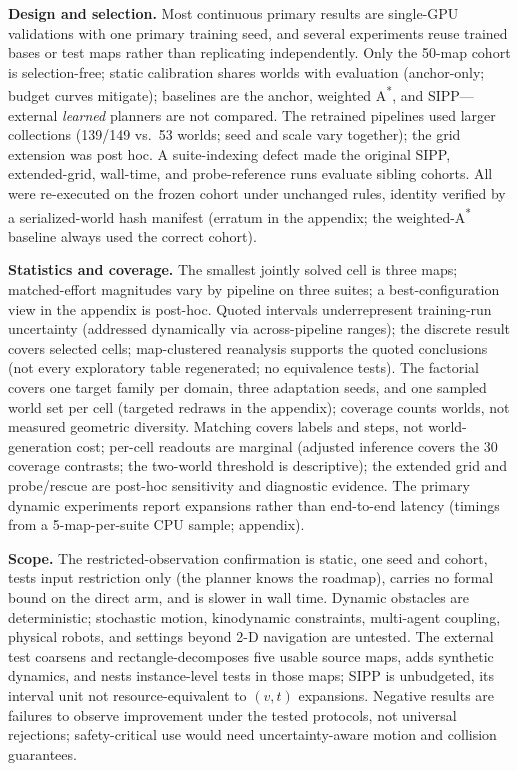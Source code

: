 \documentclass[letterpaper]{article} %
\begin{document}
\textbf{Design and selection.} Most continuous primary results are single-GPU validations with one primary training seed, and several experiments reuse trained bases or test maps rather than replicating independently. Only the 50-map cohort is selection-free; static calibration shares worlds with evaluation (anchor-only; budget curves mitigate); baselines are the anchor, weighted A\textsuperscript{*}, and SIPP---external \emph{learned} planners are not compared. The retrained pipelines used larger collections (139/149 vs.\ 53 worlds; seed and scale vary together); the grid extension was post hoc. A suite-indexing defect made the original SIPP, extended-grid, wall-time, and probe-reference runs evaluate sibling cohorts. All were re-executed on the frozen cohort under unchanged rules, identity verified by a serialized-world hash manifest (erratum in the appendix; the weighted-A\textsuperscript{*} baseline always used the correct cohort).

\textbf{Statistics and coverage.} The smallest jointly solved cell is three maps; matched-effort magnitudes vary by pipeline on three suites; a best-configuration view in the appendix is post-hoc. Quoted intervals underrepresent training-run uncertainty (addressed dynamically via across-pipeline ranges); the discrete result covers selected cells; map-clustered reanalysis supports the quoted conclusions (not every exploratory table regenerated; no equivalence tests). The factorial covers one target family per domain, three adaptation seeds, and one sampled world set per cell (targeted redraws in the appendix); coverage counts worlds, not measured geometric diversity. Matching covers labels and steps, not world-generation cost; per-cell readouts are marginal (adjusted inference covers the 30 coverage contrasts; the two-world threshold is descriptive); the extended grid and probe/rescue are post-hoc sensitivity and diagnostic evidence. The primary dynamic experiments report expansions rather than end-to-end latency (timings from a 5-map-per-suite CPU sample; appendix).

\textbf{Scope.} The restricted-observation confirmation is static, one seed and cohort, tests input restriction only (the planner knows the roadmap), carries no formal bound on the direct arm, and is slower in wall time. Dynamic obstacles are deterministic; stochastic motion, kinodynamic constraints, multi-agent coupling, physical robots, and settings beyond 2-D navigation are untested. The external test coarsens and rectangle-decomposes five usable source maps, adds synthetic dynamics, and nests instance-level tests in those maps; SIPP is unbudgeted, its interval unit not resource-equivalent to $(v,t)$ expansions. Negative results are failures to observe improvement under the tested protocols, not universal rejections; safety-critical use would need uncertainty-aware motion and collision guarantees.
\end{document}

